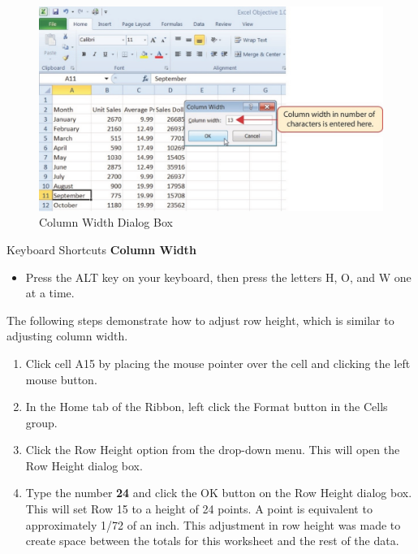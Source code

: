 \begin{figure}[H]
	\centering
	\includegraphics[width=\maxwidth{.95\linewidth}]{gfx/ch01_fig24}
	\caption{Column Width Dialog Box}
	\label{01:fig24}
\end{figure}

\begin{center}
	\begin{shtcutbox}{Keyboard Shortcuts}
		\textbf{Column Width}
		\\
		\begin{itemize}
			\setlength{\itemsep}{0pt}
			\setlength{\parskip}{0pt}
			\setlength{\parsep}{0pt}
			
			\item Press the ALT key on your keyboard, then press the letters H, O, and W one at a time.
			
		\end{itemize}
	\end{shtcutbox}
\end{center}

The following steps demonstrate how to adjust row height, which is similar to adjusting column width.

\begin{enumerate}
	\item Click cell \textsf{A15} by placing the mouse pointer over the cell and clicking the left mouse button.
	\item In the Home tab of the Ribbon, left click the Format button in the Cells group.
	\item Click the Row Height option from the drop-down menu. This will open the Row Height dialog box.
	\item Type the number \textbf{24} and click the OK button on the Row Height dialog box. This will set Row 15 to a height of 24 points. A point is equivalent to approximately 1/72 of an inch. This adjustment in row height was made to create space between the totals for this worksheet and the rest of the data.
\end{enumerate}

